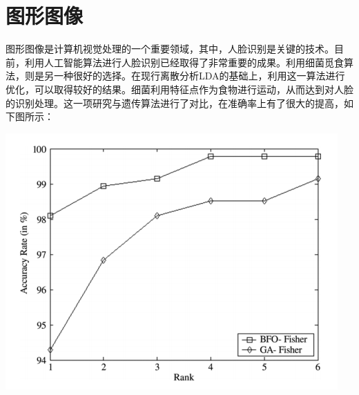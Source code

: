 \documentclass{article}
\begin{document}
\section{图形图像}
图形图像是计算机视觉处理的一个重要领域，其中，人脸识别是关键的技术。目前，利用人工智能算法进行人脸识别已经取得了非常重要的成果。利用细菌觅食算法，则是另一种很好的选择。在现行离散分析LDA的基础上，利用这一算法进行优化，可以取得较好的结果。细菌利用特征点作为食物进行运动，从而达到对人脸的识别处理。这一项研究与遗传算法进行了对比，在准确率上有了很大的提高\cite{ref4}，如下图所示：
\begin{center}
\includegraphics[scale=1]{images/face.png}
\end{center}
\end{document}
